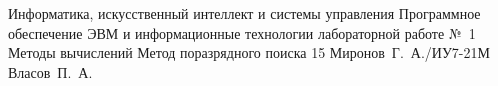\documentclass{bmstu}
\begin{document}
\makereporttitle
    {Информатика, искусственный интеллект и системы управления}
    {Программное обеспечение ЭВМ и информационные технологии}
    {лабораторной работе №~1}
    {Методы вычислений}
    {Метод поразрядного поиска}
    {15}
    {Миронов~Г.~А./ИУ7-21М}
    {Власов~П.~А.}


\end{document}
